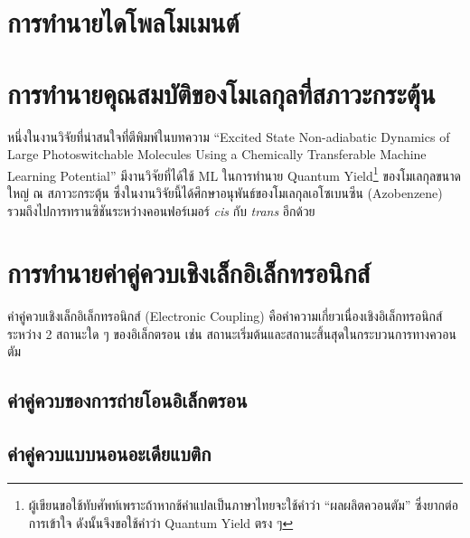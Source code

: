 \section{การทำนายไดโพลโมเมนต์}
\label{sec:pred_dipole_moment}

\section{การทำนายคุณสมบัติของโมเลกุลที่สภาวะกระตุ้น}
\label{sec:pred_ex_prop}

หนึ่งในงานวิจัยที่น่าสนใจที่ตีพิมพ์ในบทความ \enquote{Excited State Non-adiabatic Dynamics of Large Photoswitchable Molecules 
Using a Chemically Transferable Machine Learning Potential}\autocite{axelrod2022} มีงานวิจัยที่ได้ใช้ ML ในการทำนาย 
Quantum Yield\footnote{ผู้เขียนขอใช้ทับศัพท์เพราะถ้าหากช้คำแปลเป็นภาษาไทยจะใช้คำว่า \enquote{ผลผลิตควอนตัม} ซึ่งยากต่อการเข้าใจ 
ดังนั้นจึงขอใช้คำว่า Quantum Yield ตรง ๆ} ของโมเลกุลขนาดใหญ่ ณ สภาวะกระตุ้น ซึ่งในงานวิจัยนี้ได้ศึกษาอนุพันธ์ของโมเลกุลเอโซเบนซีน 
(Azobenzene) รวมถึงไปการทรานซิชันระหว่างคอนฟอร์เมอร์ \textit{cis} กับ \textit{trans} อีกด้วย

\section{การทำนายค่าคู่ควบเชิงเล็กอิเล็กทรอนิกส์}
\label{sec:pred_elec_coupling}

ค่าคู่ควบเชิงเล็กอิเล็กทรอนิกส์ (Electronic Coupling) คือค่าความเกี่ยวเนื่องเชิงอิเล็กทรอนิกส์ระหว่าง 2 สถานะใด ๆ ของอิเล็กตรอน เช่น 
สถานะเริ่มต้นและสถานะสิ้นสุดในกระบวนการทางควอนตัม 

\subsection{ค่าคู่ควบของการถ่ายโอนอิเล็กตรอน}
\label{ssec:pred_etran_coupling}



\subsection{ค่าคู่ควบแบบนอนอะเดียแบติก}
\label{ssec:nonadia_coupling}



